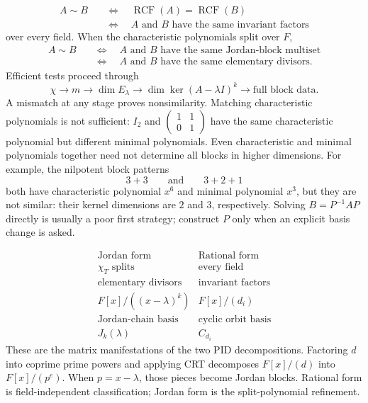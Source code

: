 \[
\begin{aligned}
A\sim B
&\quad\Longleftrightarrow\quad
\operatorname{RCF}(A)=\operatorname{RCF}(B)\\
&\quad\Longleftrightarrow\quad
\text{\(A\) and \(B\) have the same invariant factors}
\end{aligned}
\]
over every field. When the characteristic polynomials split over \(F\),
\[
\begin{aligned}
A\sim B
&\quad\Longleftrightarrow\quad
\text{\(A\) and \(B\) have the same Jordan-block multiset}\\
&\quad\Longleftrightarrow\quad
\text{\(A\) and \(B\) have the same elementary divisors}.
\end{aligned}
\]
Efficient tests proceed through
\[
\chi\longrightarrow m\longrightarrow\dim E_\lambda
\longrightarrow\dim\ker(A-\lambda I)^k
\longrightarrow\text{full block data}.
\]
A mismatch at any stage proves nonsimilarity. Matching characteristic
polynomials is not sufficient: \(I_2\) and
\(\begin{pmatrix}1&1\\0&1\end{pmatrix}\) have the same characteristic
polynomial but different minimal polynomials. Even characteristic and minimal
polynomials together need not determine all blocks in higher dimensions.
For example, the nilpotent block patterns
\[
3+3\qquad\text{and}\qquad3+2+1
\]
both have characteristic polynomial \(x^6\) and minimal polynomial \(x^3\),
but they are not similar: their kernel dimensions are \(2\) and \(3\),
respectively. Solving \(B=P^{-1}AP\) directly is usually a poor first
strategy; construct \(P\) only when an explicit basis change is asked.

\[
\begin{array}{c|c}
\text{Jordan form}&\text{Rational form}\\ \hline
\chi_T\text{ splits}&\text{every field}\\
\text{elementary divisors}&\text{invariant factors}\\
F[x]/((x-\lambda)^k)&F[x]/(d_i)\\
\text{Jordan-chain basis}&\text{cyclic orbit basis}\\
J_k(\lambda)&C_{d_i}
\end{array}
\]
These are the matrix manifestations of the two PID decompositions. Factoring
\(d\) into coprime prime powers and applying CRT decomposes \(F[x]/(d)\)
into \(F[x]/(p^e)\). When \(p=x-\lambda\), those pieces become Jordan
blocks. Rational form is field-independent classification; Jordan form is
the split-polynomial refinement.
